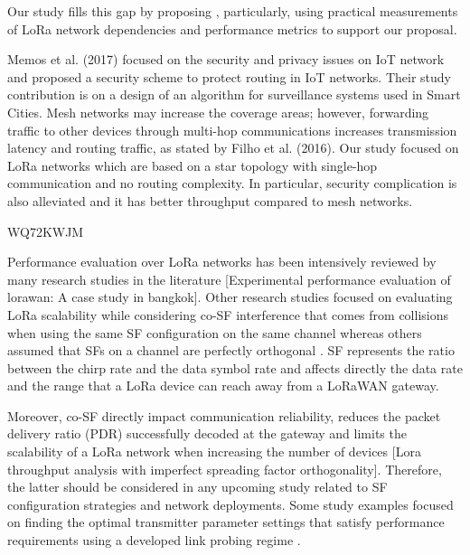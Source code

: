 Our study fills this gap by proposing \cite{chen_viable_2018},
	particularly,
	using practical measurements of LoRa network dependencies and performance metrics to support our proposal.

Memos et al.
(2017) focused on the security and privacy issues on IoT network and proposed a security scheme to protect routing in IoT networks.
Their study contribution is on a design of an algorithm for surveillance systems used in Smart Cities.
Mesh networks may increase the coverage areas;
	however,
	forwarding traffic to other devices through multi-hop communications increases transmission latency and routing traffic,
	as stated by Filho et al.
(2016).
Our study focused on LoRa networks which are based on a star topology with single-hop communication and no routing complexity.
In particular,
	security complication is also alleviated and it has better throughput compared to mesh networks.


\cite{dawaliby_adaptive_2019} WQ72KWJM

Performance evaluation over LoRa networks has been intensively reviewed by many research studies in the literature \cite{wixted_evaluation_2016} \cite{li_application_2017} [Experimental performance evaluation of lorawan:
	A case study in bangkok].
Other research studies focused on evaluating LoRa scalability \cite{mikhaylov_lorawan_2017} while considering co-SF interference that comes from collisions when using the same SF configuration on the same channel \cite{georgiou_low_2017} whereas others assumed that SFs on a channel are perfectly orthogonal \cite{bor_lora_2016} \cite{bor_lora_nodate}.
SF represents the ratio between the chirp rate and the data symbol rate and affects directly the data rate and the range that a LoRa device can reach away from a LoRaWAN gateway.

Moreover,
	co-SF directly impact communication reliability,
	reduces the packet delivery ratio (PDR) successfully decoded at the gateway \cite{piva_impact_2017} and limits the scalability of a LoRa network when increasing the number of devices [Lora throughput analysis with imperfect spreading factor orthogonality].
Therefore,
	the latter should be considered in any upcoming study related to SF configuration strategies and network deployments.
Some study examples focused on finding the optimal transmitter parameter settings that satisfy performance requirements using a developed link probing regime \cite{bor_lora_2017}.

